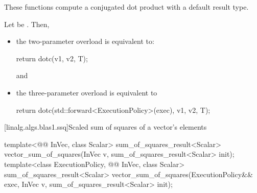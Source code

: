\begin{itemdescr}

\pnum
These functions compute a conjugated dot product with a default result type.

\pnum
\effects
Let  be .
Then,
\begin{itemize}
\item
the two-parameter overload is equivalent to:
\begin{codeblock}
return dotc(v1, v2, T{});
\end{codeblock}
and
\item
the three-parameter overload is equivalent to
\begin{codeblock}
return dotc(std::forward<ExecutionPolicy>(exec), v1, v2, T{});
\end{codeblock}
\end{itemize}
\end{itemdescr}

[linalg.algs.blas1.ssq]{Scaled sum of squares of a vector's elements}

%
\begin{itemdecl}
template<@@ InVec, class Scalar>
  sum_of_squares_result<Scalar> vector_sum_of_squares(InVec v, sum_of_squares_result<Scalar> init);
template<class ExecutionPolicy, @@ InVec, class Scalar>
  sum_of_squares_result<Scalar> vector_sum_of_squares(ExecutionPolicy&& exec,
                                                      InVec v, sum_of_squares_result<Scalar> init);
\end{itemdecl}

